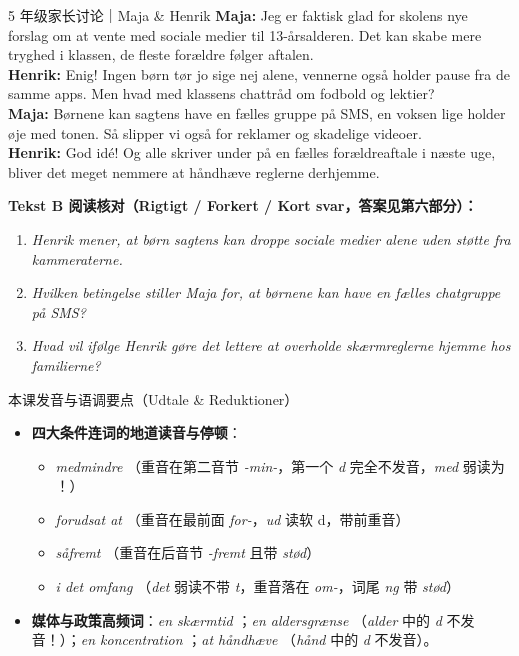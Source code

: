 \begin{emailbox}{5 年级家长讨论｜Maja \& Henrik}
\textbf{Maja:} Jeg er faktisk glad for skolens nye forslag om at vente med sociale medier til 13-årsalderen. Det kan skabe mere tryghed i klassen,  de fleste forældre følger aftalen.\\
\textbf{Henrik:} Enig! Ingen børn tør jo sige nej alene,  vennerne også holder pause fra de samme apps. Men hvad med klassens chattråd om fodbold og lektier?\\
\textbf{Maja:} Børnene kan sagtens have en fælles gruppe på SMS,  en voksen lige holder øje med tonen. Så slipper vi også for reklamer og skadelige videoer.\\
\textbf{Henrik:} God idé! Og  alle skriver under på en fælles forældreaftale i næste uge, bliver det meget nemmere at håndhæve reglerne derhjemme.
\end{emailbox}

\textbf{Tekst B 阅读核对（Rigtigt / Forkert / Kort svar，答案见第六部分）：}
\begin{enumerate}
  \item \textit{Henrik mener, at børn sagtens kan droppe sociale medier alene uden støtte fra kammeraterne.} \underline{\hspace{1.6cm}}
  \item \textit{Hvilken betingelse stiller Maja for, at børnene kan have en fælles chatgruppe på SMS?} \underline{\hspace{2.2cm}}
  \item \textit{Hvad vil ifølge Henrik gøre det lettere at overholde skærmreglerne hjemme hos familierne?} \underline{\hspace{2.2cm}}
\end{enumerate}

\begin{tipbox}{本课发音与语调要点（Udtale \& Reduktioner）}
\begin{itemize}
  \item \textbf{四大条件连词的地道读音与停顿}：
    \begin{itemize}
      \item \textit{medmindre} （重音在第二音节 \textit{-min-}，第一个 \textit{d} 完全不发音，\textit{med} 弱读为 ！）
      \item \textit{forudsat at} （重音在最前面 \textit{for-}，\textit{ud} 读软 d，带前重音）
      \item \textit{såfremt} （重音在后音节 \textit{-fremt} 且带 \textit{stød}）
      \item \textit{i det omfang} （\textit{det} 弱读不带 \textit{t}，重音落在 \textit{om-}，词尾 \textit{ng} 带 \textit{stød}）
    \end{itemize}
  \item \textbf{媒体与政策高频词}：\textit{en skærmtid} ；\textit{en aldersgrænse} （\textit{alder} 中的 \textit{d} 不发音！）；\textit{en koncentration} ；\textit{at håndhæve} （\textit{hånd} 中的 \textit{d} 不发音）。
\end{itemize}
\end{tipbox}

